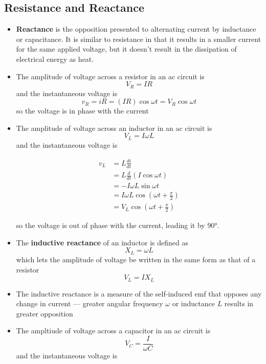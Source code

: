 \documentclass{article}
\begin{document}
\subsection{Resistance and Reactance}

\begin{itemize}
  \item \textbf{Reactance} is the opposition presented to alternating current by inductance or capacitance. It is similar to resistance in that it results in a smaller current for the same applied voltage, but it doesn't result in the dissipation of electrical energy as heat.

  \item The amplitude of voltage across a resistor in an ac circuit is \[V_R = I R\] and the instantaneous voltage is \[v_R = i R = (IR) \cos \omega t = V_R \cos \omega t\] so the voltage is in phase with the current

  \item The amplitude of voltage across an inductor in an ac circuit is \[V_L = I \omega L\] and the instantaneous voltage is

        \begin{align*}
          v_L & = L \frac{di}{dt}                                         \\
              & = L \frac{d}{dt} (I \cos \omega t)                        \\
              & = -I \omega L \sin \omega t                               \\
              & = I \omega L \cos \left( \omega t + \frac{\pi}{2} \right) \\
              & = V_L \cos \left( \omega t + \frac{\pi}{2} \right)
        \end{align*}

        so the voltage is out of phase with the current, leading it by $\ang{90}$.

  \item The \textbf{inductive reactance} of an inductor is defined as \[X_L = \omega L\] which lets the amplitude of voltage be written in the same form as that of a resistor \[V_L = I X_L\]

  \item The inductive reactance is a measure of the self-induced emf that opposes any change in current — greater angular frequency $\omega$ or inductance $L$ results in greater opposition

  \item The ampltiude of voltage across a capacitor in an ac circuit is \[V_C = \frac{I}{\omega C}\] and the instantaneous voltage is


\end{itemize}
\end{document}
